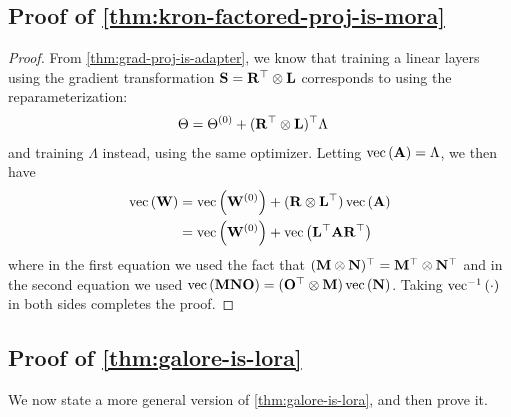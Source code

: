 \subsection{Proof of \cref{thm:kron-factored-proj-is-mora}}
\label{sec:proof-kron-factored-proj-is-mora}

\kronFacProjIsMora*
\begin{proof}
From \cref{thm:grad-proj-is-adapter}, we know that training a linear layers using the gradient transformation ${\mathbf{S}} = {\mathbf{R}}^\top \otimes {\mathbf{L}}$ corresponds to using the reparameterization:
\begin{align*}
\Theta &= \Theta^{(0)} + ({\mathbf{R}}^\top \otimes {\mathbf{L}})^\top \Lambda
\end{align*}
and training $\Lambda$ instead, using the same optimizer. Letting $\operatorname{vec}\left({\mathbf{A}}\right) = \Lambda$, we then have
\begin{align*}
\operatorname{vec}\left({\mathbf{W}}\right) &= \operatorname{vec}\left({\mathbf{W}}^{(0)}\right) + ({\mathbf{R}} \otimes {\mathbf{L}}^\top) \operatorname{vec}\left({\mathbf{A}}\right) \\
&= \operatorname{vec}\left({\mathbf{W}}^{(0)}\right) + \operatorname{vec}\left( {\mathbf{L}}^\top {\mathbf{A}} {\mathbf{R}}^\top\right)
\end{align*}
where in the first equation we used the fact that $({\mathbf{M}} \otimes {\mathbf{N}})^\top = {\mathbf{M}}^\top \otimes {\mathbf{N}}^\top$ and in the second equation we used $\operatorname{vec}\left({\mathbf{M}} {\mathbf{N}} {\mathbf{O}}\right) = ({\mathbf{O}}^\top \otimes {\mathbf{M}}) \operatorname{vec}\left({\mathbf{N}}\right)$.
Taking $\operatorname{vec}^{-1}\left(\cdot\right)$ in both sides completes the proof.
\end{proof}

\subsection{Proof of \cref{thm:galore-is-lora}}
\label{sec:proof-galore-is-lora}


We now state a more general version of \cref{thm:galore-is-lora}, and then prove it.


